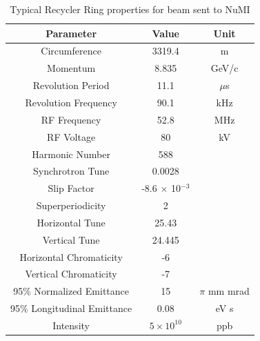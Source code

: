 \begin{table}[H]
   \centering
   \caption{Typical Recycler Ring properties for beam sent to NuMI}
   \label{tab:rrparams}
   \begin{tabular}{@{}ccc@{}}
   \toprule
   \textbf{Parameter}          & \textbf{Value}                             & \textbf{Unit} \\ \midrule
   Circumference               & 3319.4                                     & m             \\
   Momentum                    & 8.835                                      & GeV/c         \\
   Revolution Period           & 11.1                                       & $\mu$s        \\
   Revolution Frequency        & 90.1                                       & kHz        \\
   RF Frequency                & 52.8                                       & MHz           \\
   RF Voltage                  & 80                                         & kV            \\
   Harmonic Number             & 588                                        &               \\
   Synchrotron Tune            & 0.0028                                     &               \\
   Slip Factor                 & -8.6 $\times$ 10$^{-3}$                    &               \\
   Superperiodicity            & 2                                          &               \\
   Horizontal Tune             & 25.43                                      &               \\
   Vertical Tune               & 24.445                                     &               \\
   Horizontal Chromaticity     & -6                                         &               \\
   Vertical Chromaticity       & -7                                         &               \\
   95\% Normalized Emittance   & 15                                         & $\pi$ mm mrad \\
   95\% Longitudinal Emittance & 0.08                                       & eV s          \\
   Intensity                   & $5\times10^{10}$                           & ppb           \\

\end{tabular}
\end{table}
